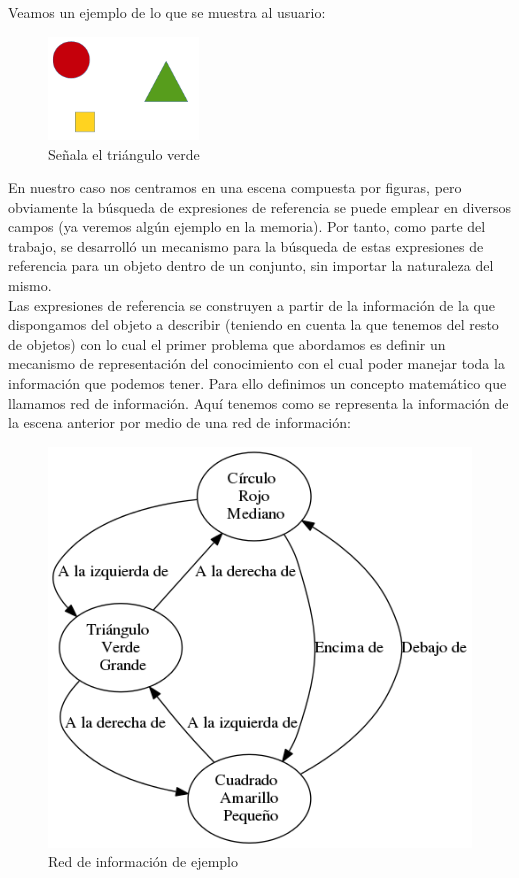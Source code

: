 \documentclass[10pt,a4paper]{article}
\begin{document}
Veamos un ejemplo de lo que se muestra al usuario:

\begin{figure}[H]
\centering
\includegraphics[width=40mm]{img/ejemplo1.png}
\caption{Señala el triángulo verde} \label{Escena de ejemplo}
\end{figure}

En nuestro caso nos centramos en una escena compuesta por figuras, pero obviamente la búsqueda de expresiones de referencia se puede emplear en diversos campos (ya veremos algún ejemplo en la memoria). Por tanto, como parte del trabajo, se desarrolló un mecanismo para la búsqueda de estas expresiones de referencia para un objeto dentro de un conjunto, sin importar la naturaleza del mismo.\\

Las expresiones de referencia se construyen a partir de la información de la que dispongamos del objeto a describir (teniendo en cuenta la que tenemos del resto de objetos) con lo cual el primer problema que abordamos es definir un mecanismo de representación del conocimiento con el cual poder manejar toda la información que podemos tener. Para ello definimos un concepto matemático que llamamos red de información. Aquí tenemos como se representa la información de la escena anterior por medio de una red de información:

\begin{figure}[H]
\centering
\includegraphics[scale=0.5]{img/RIejemplo1.png}
\caption{Red de información de ejemplo} \label{RI ejemplo}
\end{figure}
\end{document}
